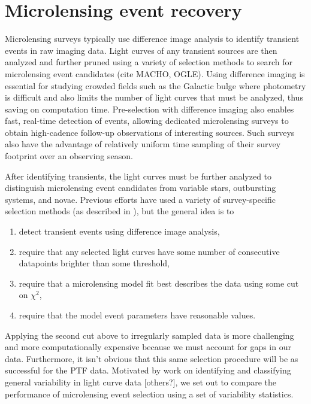 \documentclass[12pt,preprint]{aastex}
\begin{document}
\section{Microlensing event recovery} \label{sec:event_recovery}
Microlensing surveys typically use difference image analysis \citep{alard1998} to identify transient events in raw imaging data. Light curves of any transient sources are then analyzed and further pruned using a variety of selection methods to search for microlensing event candidates (cite MACHO, OGLE). Using difference imaging is essential for studying crowded fields such as the Galactic bulge where photometry is difficult and also limits the number of light curves that must be analyzed, thus saving on computation time. Pre-selection with difference imaging also enables fast, real-time detection of events, allowing dedicated microlensing surveys to obtain high-cadence follow-up observations of interesting sources. Such surveys also have the advantage of relatively uniform time sampling of their survey footprint over an observing season.

After identifying transients, the light curves must be further analyzed to distinguish microlensing event candidates from variable stars, outbursting systems, and novae. Previous efforts have used a variety of survey-specific selection methods (as described in \citealt{alcock2000, wyrzykowski2009, hamadache2009, sumi2011}), but the general idea is to \begin{enumerate}
	\item detect transient events using difference image analysis, 
	\item require that any selected light curves have some number of consecutive datapoints brighter than some threshold,
	\item require that a microlensing model fit best describes the data using some cut on $\chi^2$,
	\item require that the model event parameters have reasonable values.
\end{enumerate}
Applying the second cut above to irregularly sampled data is more challenging and more computationally expensive because we must account for gaps in our data. Furthermore, it isn't obvious that this same selection procedure will be as successful for the PTF data. Motivated by work on identifying and classifying general variability in light curve data \citep{shin2009}[others?], we set out to compare the performance of microlensing event selection using a set of variability statistics.
\end{document}
